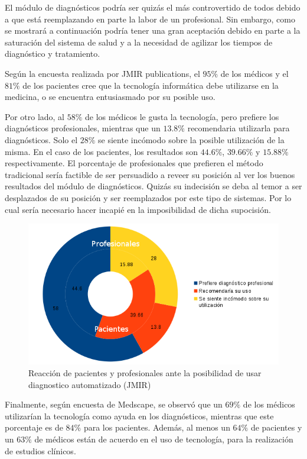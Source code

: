 \documentclass[a4paper,10pt]{article}
\begin{document}
El módulo de diagnósticos podría ser quizás el más controvertido de todos debido a que está reemplazando en parte la labor de un profesional. Sin embargo, como se mostrará a continuación podría tener una gran aceptación debido en parte a la saturación del sistema de salud y a la necesidad de agilizar los tiempos de diagnóstico y tratamiento.

Según la encuesta realizada por JMIR publications, el $95\%$ de los médicos y el  $81\%$ de los pacientes cree que la tecnología informática debe utilizarse en la medicina, o se encuentra entusiasmado por su posible uso.

Por otro lado, al $58\%$ de los médicos le gusta la tecnología, pero prefiere los diagnósticos profesionales, mientras que un $13.8\%$ recomendaria utilizarla para diagnósticos. Solo el $28\%$ se siente incómodo sobre la posible utilización de la misma. En el caso de los pacientes, los resultados son $44.6\%$, $39.66\%$ y $15.88\%$ respectivamente. El porcentaje de profesionales que prefieren el método tradicional sería factible de ser persuadido a reveer su posición al ver los buenos resultados del módulo de diagnósticos. Quizás su indecisión se deba al temor a ser desplazados de su posición y ser reemplazados por este tipo de sistemas. Por lo cual sería necesario hacer incapié en la imposibilidad de dicha supocisión.

\begin{center}
\begin{figure}[H]
\centering
\includegraphics[width=1\textwidth]{./Imagenes/g2.png}
\caption{Reacción de pacientes y profesionales ante la posibilidad de usar diagnostico automatizado (JMIR)}
\label{fig:hp}
\end{figure}
\end{center}


Finalmente, según encuesta de Medscape, se observó que un $69\%$ de los médicos utilizarían la tecnología como ayuda en los diagnósticos, mientras que este porcentaje es de $84\%$ para los pacientes. Además, al menos un $64\%$ de pacientes y un $63\%$ de médicos están de acuerdo en el uso de tecnología, para la realización de estudios clínicos.
\end{document}
